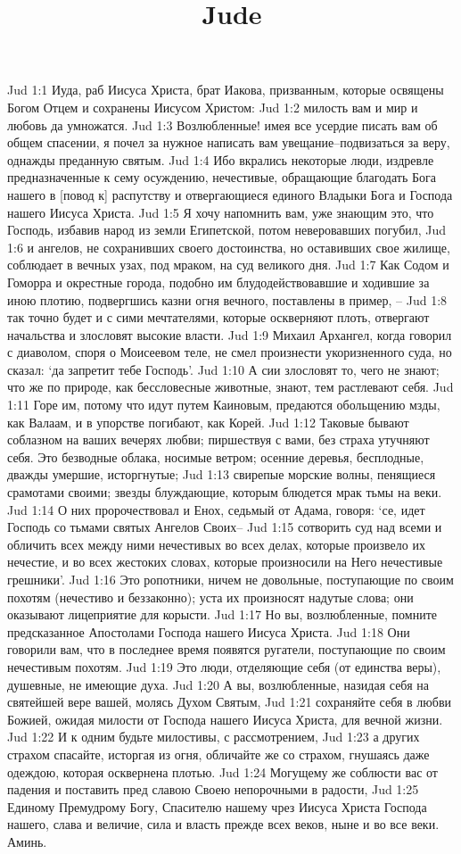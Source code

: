 

\title{Jude}

Jud 1:1  Иуда, раб Иисуса Христа, брат Иакова, призванным, которые освящены Богом Отцем и сохранены Иисусом Христом:
Jud 1:2  милость вам и мир и любовь да умножатся.
Jud 1:3  Возлюбленные! имея все усердие писать вам об общем спасении, я почел за нужное написать вам увещание--подвизаться за веру, однажды преданную святым.
Jud 1:4  Ибо вкрались некоторые люди, издревле предназначенные к сему осуждению, нечестивые, обращающие благодать Бога нашего в [повод к] распутству и отвергающиеся единого Владыки Бога и Господа нашего Иисуса Христа.
Jud 1:5  Я хочу напомнить вам, уже знающим это, что Господь, избавив народ из земли Египетской, потом неверовавших погубил,
Jud 1:6  и ангелов, не сохранивших своего достоинства, но оставивших свое жилище, соблюдает в вечных узах, под мраком, на суд великого дня.
Jud 1:7  Как Содом и Гоморра и окрестные города, подобно им блудодействовавшие и ходившие за иною плотию, подвергшись казни огня вечного, поставлены в пример, --
Jud 1:8  так точно будет и с сими мечтателями, которые оскверняют плоть, отвергают начальства и злословят высокие власти.
Jud 1:9  Михаил Архангел, когда говорил с диаволом, споря о Моисеевом теле, не смел произнести укоризненного суда, но сказал: `да запретит тебе Господь'.
Jud 1:10  А сии злословят то, чего не знают; что же по природе, как бессловесные животные, знают, тем растлевают себя.
Jud 1:11  Горе им, потому что идут путем Каиновым, предаются обольщению мзды, как Валаам, и в упорстве погибают, как Корей.
Jud 1:12  Таковые бывают соблазном на ваших вечерях любви; пиршествуя с вами, без страха утучняют себя. Это безводные облака, носимые ветром; осенние деревья, бесплодные, дважды умершие, исторгнутые;
Jud 1:13  свирепые морские волны, пенящиеся срамотами своими; звезды блуждающие, которым блюдется мрак тьмы на веки.
Jud 1:14  О них пророчествовал и Енох, седьмый от Адама, говоря: `се, идет Господь со тьмами святых Ангелов Своих--
Jud 1:15  сотворить суд над всеми и обличить всех между ними нечестивых во всех делах, которые произвело их нечестие, и во всех жестоких словах, которые произносили на Него нечестивые грешники'.
Jud 1:16  Это ропотники, ничем не довольные, поступающие по своим похотям (нечестиво и беззаконно); уста их произносят надутые слова; они оказывают лицеприятие для корысти.
Jud 1:17  Но вы, возлюбленные, помните предсказанное Апостолами Господа нашего Иисуса Христа.
Jud 1:18  Они говорили вам, что в последнее время появятся ругатели, поступающие по своим нечестивым похотям.
Jud 1:19  Это люди, отделяющие себя (от единства веры), душевные, не имеющие духа.
Jud 1:20  А вы, возлюбленные, назидая себя на святейшей вере вашей, молясь Духом Святым,
Jud 1:21  сохраняйте себя в любви Божией, ожидая милости от Господа нашего Иисуса Христа, для вечной жизни.
Jud 1:22  И к одним будьте милостивы, с рассмотрением,
Jud 1:23  а других страхом спасайте, исторгая из огня, обличайте же со страхом, гнушаясь даже одеждою, которая осквернена плотью.
Jud 1:24  Могущему же соблюсти вас от падения и поставить пред славою Своею непорочными в радости,
Jud 1:25  Единому Премудрому Богу, Спасителю нашему чрез Иисуса Христа Господа нашего, слава и величие, сила и власть прежде всех веков, ныне и во все веки. Аминь.


